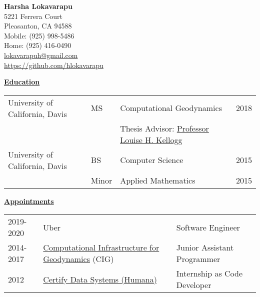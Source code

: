\documentclass[11pt]{ltxdoc}
\begin{document}
\begin{center}
  \textbf{Harsha Lokavarapu}                                            \\ [06pt]
  5221 Ferrera Court                                                    \\
  Pleasanton, CA 94588                                                  \\
  Mobile: (925) 998-5486                                                 \\
  Home:   (925) 416-0490                                                 \\
 \href{mailto:lokavarapuh@gmail.com}{lokavarapuh@gmail.com}             \\
  \href{https://github.com/hlokavarapu}{https://github.com/hlokavarapu} \\ [3pt]
\end{center}


\vskip 12pt

\begin{center}
	\textbf{\underline{Education}}
\end{center}

\vskip -06pt

\begin{center}
\begin{tabular}{llll}
University of California, Davis              &MS       &Computational Geodynamics      & 2018 \\
                                             &       &Thesis Advisor: \href{http://geology.ucdavis.edu/people/faculty/kellogg.php}{Professor Louise H. Kellogg}        &  \\
University of California, Davis              &BS      & Computer Science                         & 2015       \\
                                             &Minor   & Applied Mathematics                      & 2015
\end{tabular}
\end{center}
\vskip 18pt

\begin{center}
	\textbf{\underline{Appointments}}
\end{center}

\begin{center}
\begin{tabular}{lll}
2019-2020     & Uber & Software Engineer \\
2014-2017     & \href{https://geodynamics.org/cig/}{Computational Infrastructure for Geodynamics} (CIG) & Junior Assistant Programmer \\
2012       & \href{https://www.humana.com}{Certify Data Systems (Humana)} & Internship as Code Developer
\end{tabular}
\end{center}
\end{document}
